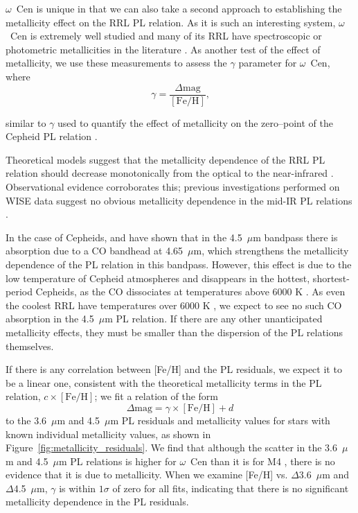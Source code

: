 \documentclass[a4paper,fleqn,usenatbib]{mnras}
\begin{document}
$\omega$~Cen is unique in that we can also take a second approach to establishing the metallicity effect on the RRL PL relation. As it is such an interesting system, $\omega$~Cen is extremely well studied and many of its RRL have spectroscopic or photometric metallicities in the literature \citep[e.g.][]{2006ApJ...640L..43S, 2000AJ....119.1824R}. As another test of the effect of metallicity, we use these measurements to assess the $\gamma$ parameter for $\omega$~Cen, where 
\begin{equation} \label{eqn:gamma}
\gamma = \dfrac {\Delta \text{mag}} {[\text{Fe/H}]}\text{,}
\end{equation}

similar to $\gamma$ used to quantify the effect of metallicity on the zero--point of the Cepheid PL relation \citep{1998ApJ...498..181K}. 

Theoretical models suggest that the metallicity dependence of the RRL PL relation should decrease monotonically from the optical to the near-infrared \citep{2001MNRAS.326.1183B, 2004ApJS..154..633C}. Observational evidence corroborates this; previous investigations performed on WISE data suggest no obvious metallicity dependence in the mid-IR PL relations \citep{2013ApJ...776..135M}.

In the case of Cepheids, \citet{2011ApJ...743...76S} and \citet{2015arXiv150206995S} have shown that in the 4.5~$\mu$m bandpass there is absorption due to a CO bandhead at 4.65~$\mu$m, which strengthens the metallicity dependence of the PL relation in this bandpass. However, this effect is due to the low temperature of Cepheid atmospheres and disappears in the hottest, shortest-period Cepheids, as the CO dissociates at temperatures above 6000 K \citep{2012ApJ...759..146M}. As even the coolest RRL have temperatures over 6000 K \citep{1971PASP...83..697I}, we expect to see no such CO absorption in the 4.5~$\mu$m PL relation. If there are any other unanticipated metallicity effects, they must be smaller than the dispersion of the PL relations themselves.

If there is any correlation between [Fe/H] and the PL residuals, we expect it to be a linear one, consistent with the theoretical metallicity terms in the PL relation, $c\times[\text{Fe/H}]$; we fit a relation of the form
\begin{equation}
\Delta\text{mag} = \gamma \times[\text{Fe/H}] + d
\end{equation}
to the 3.6~$\mu$m and 4.5~$\mu$m PL residuals and metallicity values for stars with known individual metallicity values, as shown in Figure~\ref{fig:metallicity_residuals}. We find that although the scatter in the 3.6~$\mu$m and 4.5~$\mu$m PL relations is higher for $\omega$~Cen than it is for M4 \citep{2015arXiv150507858N, 2015ApJ...799..165B}, there is no evidence that it is due to metallicity. When we examine [Fe/H] vs. $\Delta$3.6~$\mu$m and $\Delta$4.5~$\mu$m, $\gamma$ is within $1\sigma$ of zero for all fits, indicating that there is no significant metallicity dependence in the PL residuals.
\end{document}
